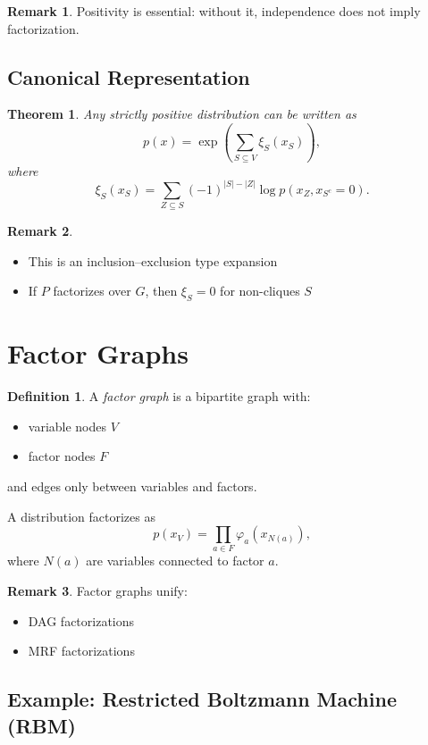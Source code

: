\documentclass[12pt,oneside]{book}
\numberwithin{equation}{section}
\theoremstyle{definition}
\newtheorem{definition}{Definition}[section]
\newtheorem{remark}{Remark}[section]
\theoremstyle{plain}
\newtheorem{theorem}{Theorem}[section]
\theoremstyle{remark}
\begin{document}
\begin{remark}
Positivity is essential: without it, independence does not imply factorization.
\end{remark}


\subsection*{Canonical Representation}

\begin{theorem}
Any strictly positive distribution can be written as
\[
p(x) = \exp\left( \sum_{S \subseteq V} \xi_S(x_S) \right),
\]
where
\[
\xi_S(x_S) = \sum_{Z \subseteq S} (-1)^{|S|-|Z|} \log p(x_Z, x_{S^c}=0).
\]
\end{theorem}

\begin{remark}
\begin{itemize}
\item This is an inclusion--exclusion type expansion
\item If $P$ factorizes over $G$, then $\xi_S = 0$ for non-cliques $S$
\end{itemize}
\end{remark}


\section{Factor Graphs}

\begin{definition}
A \emph{factor graph} is a bipartite graph with:
\begin{itemize}
\item variable nodes $V$
\item factor nodes $F$
\end{itemize}
and edges only between variables and factors.

A distribution factorizes as
\[
p(x_V) = \prod_{a \in F} \varphi_a(x_{N(a)}),
\]
where $N(a)$ are variables connected to factor $a$.
\end{definition}

\begin{remark}
Factor graphs unify:
\begin{itemize}
\item DAG factorizations
\item MRF factorizations
\end{itemize}
\end{remark}


\subsection{Example: Restricted Boltzmann Machine (RBM)}
\end{document}
